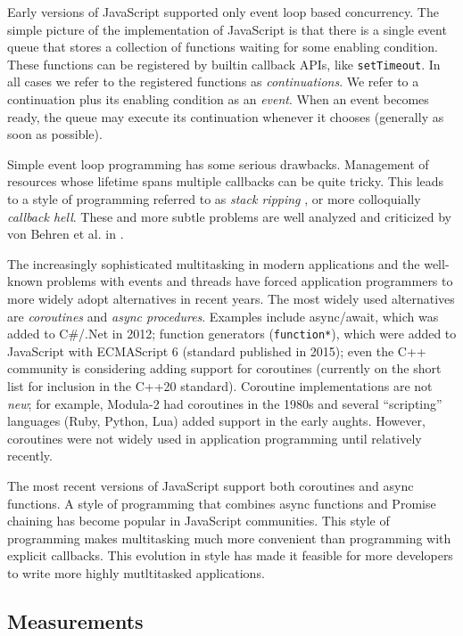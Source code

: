 \documentclass[acmsmall,anonymous,review]{acmart}\settopmatter{printfolios=true,printccs=false,printacmref=false}
\begin{document}
Early versions of JavaScript supported only event loop based concurrency.
The simple picture of the implementation of JavaScript is that there is a single event queue that stores a collection of functions waiting for some enabling condition.
These functions can be registered by builtin callback APIs, like \texttt{setTimeout}.
In all cases we refer to the registered functions as \emph{continuations}.
We refer to a continuation plus its enabling condition as an \emph{event}.
When an event becomes ready, the queue may execute its continuation whenever it chooses (generally as soon as possible).

Simple event loop programming has some serious drawbacks.
Management of resources whose lifetime spans multiple callbacks can be quite tricky.
This leads to a style of programming referred to as \emph{stack ripping} \cite{Adya2002}, or more colloquially \emph{callback hell}.
These and more subtle problems are well analyzed and criticized by von Behren et al. in \cite{Behren2003a}.

The increasingly sophisticated multitasking in modern applications and the well-known problems with events and threads have forced application programmers to more widely adopt alternatives in recent years.
The most widely used alternatives are \emph{coroutines} and \emph{async procedures}.
Examples include async/await, which was added to C\#/.Net in 2012; function generators (\texttt{function*}), which were added to JavaScript with ECMAScript 6 (standard published in 2015); even the C++ community is considering adding support for coroutines (currently on the short list for inclusion in the C++20 standard).
Coroutine implementations are not \emph{new}; for example, Modula-2 had coroutines in the 1980s and several ``scripting'' languages (Ruby, Python, Lua) added support in the early aughts.
However, coroutines were not widely used in application programming until relatively recently.

The most recent versions of JavaScript support both coroutines and async functions.
A style of programming that combines async functions and Promise chaining has become popular in JavaScript communities.
This style of programming makes multitasking much more convenient than programming with explicit callbacks.
This evolution in style has made it feasible for more developers to write more highly mutltitasked applications.

\subsection{Measurements}
\end{document}
